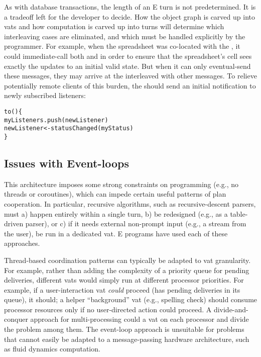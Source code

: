 \documentclass{llncs}
\begin{document}
As with database transactions, the length of an E turn is not
predetermined. It is a tradeoff left for the developer to decide. How
the object graph is carved up into vats and how computation is carved
up into turns will determine which interleaving cases are eliminated,
and which must be handled explicitly by the programmer. For example,
when the spreadsheet was co-located with the , it
could immediate-call both  and  in
order to ensure that the spreadsheet's cell sees exactly the updates
to an initial valid state. But when it can only eventual-send these
messages, they may arrive at the  interleaved with
other messages. To relieve potentially remote clients of this burden,
the  should send an initial notification to newly
subscribed listeners:
%
\begin{alltt}
    to () \{
        myListeners.push(newListener)
        newListener <- statusChanged(myStatus)
    \}
\end{alltt}
%

\subsection{Issues with Event-loops}

This architecture imposes some strong constraints on programming
(e.g., no threads or coroutines), which can impede certain useful
patterns of plan cooperation. In particular, recursive algorithms,
such as recursive-descent parsers, must a) happen entirely within a
single turn, b) be redesigned (e.g., as a table-driven parser), or c)
if it needs external non-prompt input (e.g., a stream from the user),
be run in a dedicated vat. E programs have used each of these
approaches.

Thread-based coordination patterns can typically be adapted to vat
granularity.  For example, rather than adding the complexity of a
priority queue for pending deliveries, different vats would simply run
at different processor priorities. For example, if a user-interaction
vat \emph{could} proceed (has pending deliveries in its queue), it
should; a helper ``background'' vat (e.g., spelling check) should
consume processor resources only if no user-directed action could
proceed. A divide-and-conquer approach for multi-processing could a
vat on each processor and divide the problem among them. The
event-loop approach is unsuitable for problems that cannot easily be
adapted to a message-passing hardware architecture, such as fluid
dynamics computation.
\end{document}
